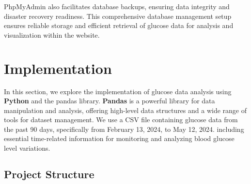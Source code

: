 \documentclass{article}
\begin{document}
PhpMyAdmin also facilitates database backups, ensuring data integrity and disaster recovery readiness. This comprehensive database management setup ensures reliable storage and efficient retrieval of glucose data for analysis and visualization within the website.


\section{Implementation}

In this section, we explore the implementation of glucose data analysis using \textbf{Python} and the pandas library. \textbf{Pandas} is a powerful library for data manipulation and analysis, offering high-level data structures and a wide range of tools for dataset management. We use a CSV file containing glucose data from the past 90 days, specifically from February 13, 2024, to May 12, 2024. including essential time-related information for monitoring and analyzing blood glucose level variations.

\subsection{Project Structure}
\end{document}
